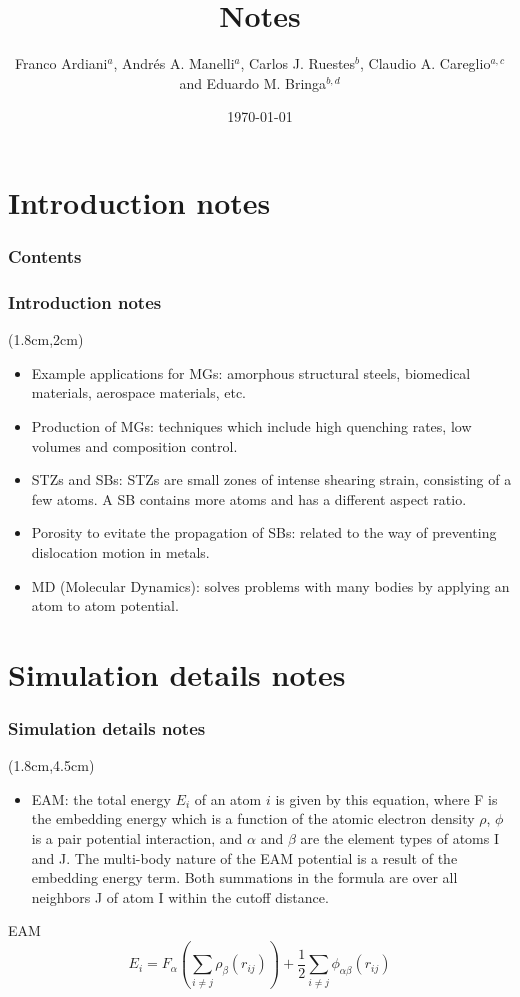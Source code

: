 \documentclass[12pt,t]{beamer}
\title[Notes]{Notes}
\author[F.Ardiani, A.A. Manelli, C.J. Ruestes, C.A. Careglio, E.M. Bringa]{Franco Ardiani$^a$, Andrés A. Manelli$^a$, Carlos J. Ruestes$^b$, Claudio A. Careglio$^{a,c}$ and Eduardo M. Bringa$^{b,d}$}
\institute[UNCUYO]{$^a$Facultad de Ingeniería, Universidad Nacional de Cuyo\\$^b$ITIC, Universidad Nacional de Cuyo\\$^c$FCEN, Universidad Nacional de Cuyo\\$^d$CONICET}
\date{\today}
\begin{document}
\section{Introduction notes}

\begin{frame}
   \frametitle{Contents}
   \tableofcontents[currentsection,sectionstyle=show/shaded,subsectionstyle=show/shaded/hide]
\end{frame}

\begin{frame}
\frametitle{Introduction notes}
 \begin{textblock*}{10.6cm}(1.8cm,2cm) 
\begin{itemize}
  \item Example applications for MGs: amorphous structural steels, biomedical materials, aerospace materials, etc.
  \item Production of MGs: techniques which include high quenching rates, low volumes and composition control.
  \item STZs and SBs: STZs are small zones of intense shearing strain, consisting of a few atoms. A SB contains more atoms and has a different aspect ratio.
  \item Porosity to evitate the propagation of SBs: related to the way of preventing dislocation motion in metals.
 \item MD (Molecular Dynamics): solves problems with many bodies by applying an atom to atom potential.
\end{itemize} 
\end{textblock*}
\end{frame}

\section{Simulation details notes}

\begin{frame}
\frametitle{Simulation details notes}
\vspace{-0.3cm}
 \begin{textblock*}{10.6cm}(1.8cm,4.5cm) 
\begin{itemize}
 \item EAM: the total energy $E_i$ of an atom $i$ is given by this equation, where F is the embedding energy which is a function of the atomic electron density $\rho$, $\phi$ is a pair potential interaction, and $\alpha$ and $\beta$ are the element types of atoms I and J. The multi-body nature of the EAM potential is a result of the embedding energy term. Both summations in the formula are over all neighbors J of atom I within the cutoff distance.
\end{itemize}
\end{textblock*}
	\begin{exampleblock}{EAM}
	\[
		E_i=F_{\alpha} \left ( \sum \limits_{i\neq j} \rho _{\beta} (r_{ij}) \right ) + \frac{1}{2} \sum \limits_{i\neq j} \phi _{\alpha \beta} (r_{ij})
	\]
	\end{exampleblock}
\end{frame}
\end{document}
